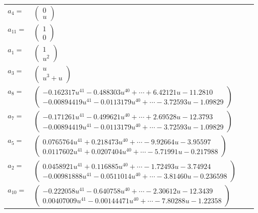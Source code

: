\documentclass[1p]{elsarticle_modified}
\theoremstyle{definition}
\begin{document}
\begin{tabular}{m{7pt} m{180pt} m{7pt} m{180pt} }
\flushright $a_{4}=$&$\begin{pmatrix}0\\u\end{pmatrix}$ \\
\flushright $a_{11}=$&$\begin{pmatrix}1\\0\end{pmatrix}$ \\
\flushright $a_{1}=$&$\begin{pmatrix}1\\u^2\end{pmatrix}$ \\
\flushright $a_{3}=$&$\begin{pmatrix}u\\u^3+u\end{pmatrix}$ \\
\flushright $a_{8}=$&$\begin{pmatrix}-0.162317 u^{41}-0.488303 u^{40}+\cdots+6.42121 u-11.2810\\-0.00894419 u^{41}-0.0113179 u^{40}+\cdots-3.72593 u-1.09829\end{pmatrix}$ \\
\flushright $a_{7}=$&$\begin{pmatrix}-0.171261 u^{41}-0.499621 u^{40}+\cdots+2.69528 u-12.3793\\-0.00894419 u^{41}-0.0113179 u^{40}+\cdots-3.72593 u-1.09829\end{pmatrix}$ \\
\flushright $a_{5}=$&$\begin{pmatrix}0.0765764 u^{41}+0.218473 u^{40}+\cdots-9.92664 u-3.95597\\0.0117602 u^{41}+0.0207404 u^{40}+\cdots-5.71991 u-0.217988\end{pmatrix}$ \\
\flushright $a_{2}=$&$\begin{pmatrix}0.0458921 u^{41}+0.116885 u^{40}+\cdots-1.72493 u-3.74924\\-0.00981888 u^{41}-0.0511014 u^{40}+\cdots-3.81460 u-0.236598\end{pmatrix}$ \\
\flushright $a_{10}=$&$\begin{pmatrix}-0.222058 u^{41}-0.640758 u^{40}+\cdots-2.30612 u-12.3439\\0.00407009 u^{41}-0.00144471 u^{40}+\cdots-7.80288 u-1.22358\end{pmatrix}$ \\

\end{tabular}
\end{document}
